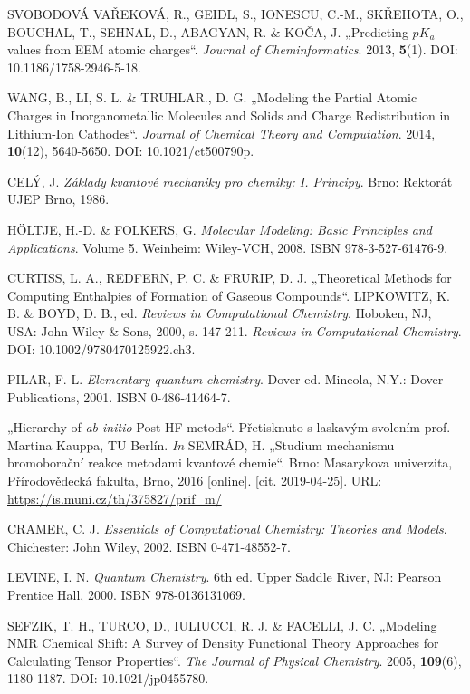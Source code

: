 \begin{thebibliography}{10}
SVOBODOVÁ VAŘEKOVÁ, R., GEIDL, S., IONESCU, C.-M., SKŘEHOTA, O., BOUCHAL, T., SEHNAL, D., ABAGYAN, R. \& KOČA, J. „Predicting $pK_a$ values from EEM atomic charges“. \textit{Journal of Cheminformatics}. 2013, \textbf{5}(1). DOI: 10.1186/1758-2946-5-18.

WANG, B., LI, S. L. \& TRUHLAR., D. G. „Modeling the Partial Atomic Charges in Inorganometallic Molecules and Solids and Charge Redistribution in Lithium-Ion Cathodes“. \textit{Journal of Chemical Theory and Computation}. 2014, \textbf{10}(12), 5640-5650. DOI: 10.1021/ct500790p.


CELÝ, J. \textit{Základy kvantové mechaniky pro chemiky: I. Principy}. Brno: Rektorát UJEP Brno, 1986.

HÖLTJE, H.-D. \& FOLKERS, G. \textit{Molecular Modeling: Basic Principles and Applications}. Volume 5. Weinheim: Wiley-VCH, 2008. ISBN 978-3-527-61476-9.

CURTISS, L. A., REDFERN, P. C. \& FRURIP, D. J. „Theoretical Methods for Computing Enthalpies of Formation of Gaseous Compounds“. LIPKOWITZ, K. B. \& BOYD, D. B., ed. \textit{Reviews in Computational Chemistry}. Hoboken, NJ, USA: John Wiley \& Sons, 2000, s. 147-211. \textit{Reviews in Computational Chemistry}. DOI: 10.1002/9780470125922.ch3.

PILAR, F. L. \textit{Elementary quantum chemistry}. Dover ed. Mineola, N.Y.: Dover Publications, 2001. ISBN 0-486-41464-7.

„Hierarchy of \textit{ab initio} Post-HF metods“. Přetisknuto s laskavým svolením prof. Martina Kauppa, TU Berlín. \textit{In} SEMRÁD, H. „Studium mechanismu bromoborační reakce metodami kvantové chemie“. Brno: Masarykova univerzita, Přírodovědecká fakulta, Brno, 2016 [online]. [cit. 2019-04-25]. URL: \url{https://is.muni.cz/th/375827/prif_m/}

CRAMER, C. J. \textit{Essentials of Computational Chemistry: Theories and Models}. Chichester: John Wiley, 2002. ISBN 0-471-48552-7.

LEVINE, I. N. \textit{Quantum Chemistry}. 6th ed. Upper Saddle River, NJ: Pearson Prentice Hall, 2000. ISBN 978-0136131069.

SEFZIK, T. H., TURCO, D., IULIUCCI, R. J. \& FACELLI, J. C. „Modeling NMR Chemical Shift: A Survey of Density Functional Theory Approaches for Calculating Tensor Properties“. \textit{The Journal of Physical Chemistry}. 2005, \textbf{109}(6), 1180-1187. DOI:     10.1021/jp0455780.


\end{thebibliography}
